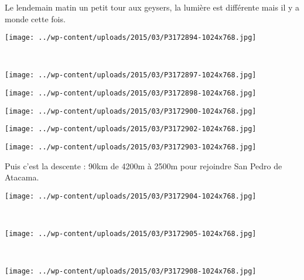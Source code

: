 \pagebreak
  Le lendemain matin un petit tour aux geysers, la lumière est différente mais il y a monde cette fois. 
\begin{center} \texttt{[image: ../wp-content/uploads/2015/03/P3172894-1024x768.jpg]} \end{center}
~
\begin{center} \texttt{[image: ../wp-content/uploads/2015/03/P3172897-1024x768.jpg]} \end{center}
\begin{center} \texttt{[image: ../wp-content/uploads/2015/03/P3172898-1024x768.jpg]} \end{center}
\begin{center} \texttt{[image: ../wp-content/uploads/2015/03/P3172900-1024x768.jpg]} \end{center}
\begin{center} \texttt{[image: ../wp-content/uploads/2015/03/P3172902-1024x768.jpg]} \end{center}
\vfill
\begin{center} \texttt{[image: ../wp-content/uploads/2015/03/P3172903-1024x768.jpg]} \end{center}
\vspace{-\topsep}
\vspace{-0.75mm}

\pagebreak
 Puis c'est la descente : 90km de 4200m à 2500m pour rejoindre San Pedro de Atacama. 
\begin{center} \texttt{[image: ../wp-content/uploads/2015/03/P3172904-1024x768.jpg]} \end{center}
~
\begin{center} \texttt{[image: ../wp-content/uploads/2015/03/P3172905-1024x768.jpg]} \end{center}
\vspace{-\topsep}
\pagebreak
~\\
\vspace{0.5mm}
\begin{center} \texttt{[image: ../wp-content/uploads/2015/03/P3172908-1024x768.jpg]} \end{center}

